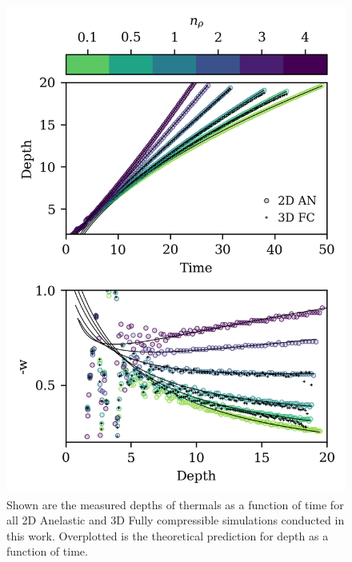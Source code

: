 \documentclass[twocolumn, amsmath, amsfonts, amssymb, trackchanges]{aastex62}
\begin{document}
\begin{figure}[t!]
    \includegraphics[width=\columnwidth]{results_panels.png}
    \caption{
	Shown are the measured depths of thermals as a function of time for all 2D Anelastic and 3D Fully compressible simulations conducted in this work. 
	Overplotted is the theoretical prediction for depth as a function of time.
    \label{fig:results_d_v_t} }
\end{figure}
\end{document}
